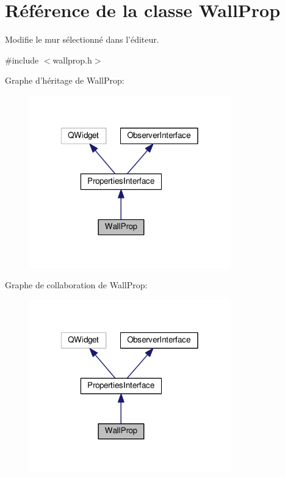 \hypertarget{classWallProp}{\section{Référence de la classe Wall\+Prop}
\label{classWallProp}
}


Modifie le mur sélectionné dans l’éditeur.  




{\ttfamily \#include $<$wallprop.\+h$>$}



Graphe d'héritage de Wall\+Prop\+:\nopagebreak
\begin{figure}[H]
\begin{center}
\leavevmode
\includegraphics[width=247pt]{dd/d41/classWallProp__inherit__graph}
\end{center}
\end{figure}


Graphe de collaboration de Wall\+Prop\+:\nopagebreak
\begin{figure}[H]
\begin{center}
\leavevmode
\includegraphics[width=247pt]{da/dd5/classWallProp__coll__graph}
\end{center}
\end{figure}
